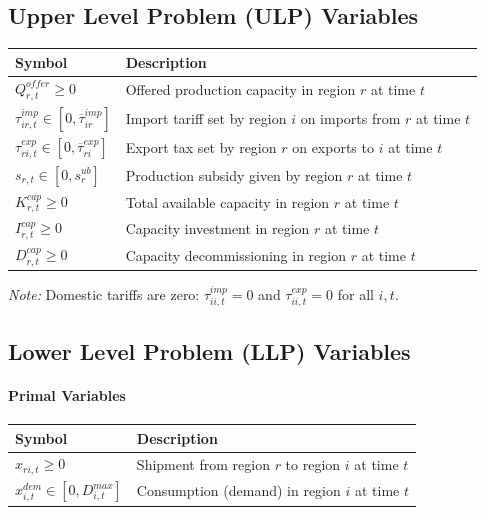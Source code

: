 \subsection{Upper Level Problem (ULP) Variables}

\begin{flushleft}
\begin{tabular}{@{}lp{10cm}@{}}
\toprule
\textbf{Symbol} & \textbf{Description} \\
\midrule
$Q^{offer}_{r,t} \ge 0$ & Offered production capacity in region $r$ at time $t$ \\
$\tau^{imp}_{ir,t} \in [0, \overline{\tau}^{imp}_{ir}]$ & Import tariff set by region $i$ on imports from $r$ at time $t$ \\
$\tau^{exp}_{ri,t} \in [0, \overline{\tau}^{exp}_{ri}]$ & Export tax set by region $r$ on exports to $i$ at time $t$ \\
$s_{r,t} \in [0, s^{ub}_r]$ & Production subsidy given by region $r$ at time $t$ \\
$K^{cap}_{r,t} \ge 0$ & Total available capacity in region $r$ at time $t$ \\
$I^{cap}_{r,t} \ge 0$ & Capacity investment in region $r$ at time $t$ \\
$D^{cap}_{r,t} \ge 0$ & Capacity decommissioning in region $r$ at time $t$ \\
\bottomrule
\end{tabular}
\end{flushleft}

\noindent\textit{Note:} Domestic tariffs are zero: $\tau^{imp}_{ii,t} = 0$ and $\tau^{exp}_{ii,t} = 0$ for all $i, t$.

\subsection{Lower Level Problem (LLP) Variables}

\paragraph{Primal Variables}

\begin{flushleft}
\begin{tabular}{@{}lp{10cm}@{}}
\toprule
\textbf{Symbol} & \textbf{Description} \\
\midrule
$x_{ri,t} \ge 0$ & Shipment from region $r$ to region $i$ at time $t$ \\
$x^{dem}_{i,t} \in [0, D^{max}_{i,t}]$ & Consumption (demand) in region $i$ at time $t$ \\
\bottomrule
\end{tabular}
\end{flushleft}


